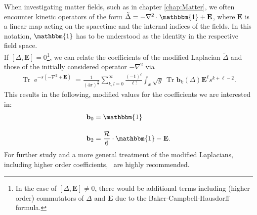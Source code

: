When investigating matter fields, such as in chapter \ref{chap:Matter}, we often encounter kinetic operators of the form $\tilde{\Delta} = -\nabla^2\cdot\mathbbm{1} +  \mathbf{E}$, where $\mathbf{E}$ is a linear map acting on the spacetime and the internal indices of the fields. In this notation, $\mathbbm{1}$ has to be understood as the identity in the respective field space. \\
If $\left[\Delta, \mathbf{E}\right] = 0$\footnote{In the case of $\left[\Delta, \mathbf{E}\right] \neq 0$, there would be additional terms including (higher order) commutators of $\Delta$ and $\mathbf{E}$ due to the Baker-Campbell-Hausdorff formula.}, we can relate the coefficients of the modified Laplacian $\tilde{\Delta}$ and those of the initially considered operator $-\nabla^2$ via
\begin{align}
	\operatorname{Tr} \operatorname{e}^{-s\left(-\nabla^{2}+\mathbf{E}\right)}=\frac{1}{(4 \pi)^{\frac{d}{2}}} \sum_{k, l=0}^{\infty} \frac{(-1)^{\ell}}{\ell !} \int_x \sqrt{g} \ \operatorname{Tr} \mathbf{b}_{k}(\Delta) \mathbf{E}^{\ell} s^{k+\ell-2}.
\end{align}
This results in the following, modified values for the coefficients we are interested in:
\begin{align}
	\mathbf{b}_0 &= \mathbbm{1} \\[10pt]
	\mathbf{b}_2 &= \frac{\mathcal{R}}{6}\cdot\mathbbm{1} - \mathbf{E}.
\end{align} 
For further study and a more general treatment of the modified Laplacians, including higher order coefficients,\ \cite{CodelloPercacciRahmede2008, Percacci2017} are highly recommended.